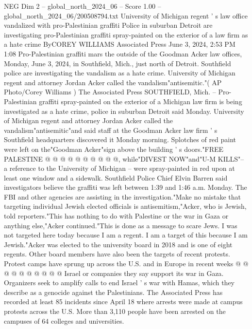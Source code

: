 \begin{textsample}{NEG Dim 2 – global\_north\_2024\_06 – Score 1.00 – global\_north\_2024\_06/200508794.txt}  \label{ex:f2_neg_194}
University of Michigan regent ' s law office vandalized with pro-Palestinian graffiti Police in suburban Detroit are investigating pro-Palestinian graffiti spray-painted on the exterior of a law firm as a hate crime ByCOREY WILLIAMS Associated Press June 3, 2024, 2:53 PM 1:08 Pro-Palestinian graffiti mars the outside of the Goodman Acker law offices, Monday, June 3, 2024, in Southfield, Mich., just north of Detroit.
Southfield police are investigating the vandalism as a hate crime.
University of Michigan regent and attorney Jordan Acker called the vandalism"antisemitic."( AP Photo/Corey Williams ) The Associated Press SOUTHFIELD, Mich. -- Pro-Palestinian graffiti spray-painted on the exterior of a Michigan law firm is being investigated as a hate crime, police in suburban Detroit said Monday.
University of Michigan regent and attorney Jordan Acker called the vandalism"antisemitic"and said staff at the Goodman Acker law firm ' s Southfield headquarters discovered it Monday morning.
Splotches of red paint were left on the"Goodman Acker"sign above the building ' s doors."FREE PALESTINE @ @ @ @ @ @ @ @ @ @, while"DIVEST NOW"and"U-M KILLS"-- a reference to the University of Michigan -- were spray-painted in red upon at least one window and a sidewalk.
Southfield Police Chief Elvin Barren said investigators believe the graffiti was left between 1:39 and 1:46 a.m.
Monday.
The FBI and other agencies are assisting in the investigation."Make no mistake that targeting individual Jewish elected officials is antisemitism,"Acker, who is Jewish, told reporters."This has nothing to do with Palestine or the war in Gaza or anything else,"Acker continued."This is done as a message to scare Jews.
I was not targeted here today because I am a regent.
I am a target of this because I am Jewish."Acker was elected to the university board in 2018 and is one of eight regents.
Other board members have also been the targets of recent protests.
Protest camps have sprung up across the U.S. and in Europe in recent weeks @ @ @ @ @ @ @ @ @ @ Israel or companies they say support its war in Gaza.
Organizers seek to amplify calls to end Israel ' s war with Hamas, which they describe as a genocide against the Palestinians.
The Associated Press has recorded at least 85 incidents since April 18 where arrests were made at campus protests across the U.S.
More than 3,110 people have been arrested on the campuses of 64 colleges and universities.

\end{textsample}
